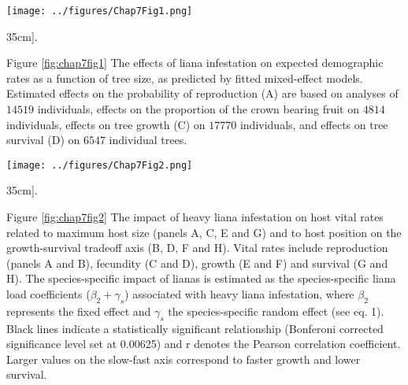 \documentclass[b5paper,justified]{tufte-book} %
\begin{document}
\begin{fullwidth}
\begin{figure*}
\hspace*{.5cm}\texttt{[image: ../figures/Chap7Fig1.png]}
\caption[The effects of liana infestation on expected demographic rates as a function of tree size][35cm]{.}
\label{fig:chap7fig1}
\hspace*{0.7cm} \begin{minipage}{12cm}
\footnotesize Figure \ref{fig:chap7fig1} 
The effects of liana infestation on expected demographic rates as a function of tree size, as predicted by fitted mixed-effect models.  Estimated effects on the probability of reproduction (A) are based on analyses of $14519$ individuals, effects on the proportion of the crown bearing fruit on $4814$  individuals, effects on tree growth (C) on $17770$  individuals, and effects on tree survival (D) on $6547$ individual trees.
\end{minipage}
\end{figure*}

\begin{figure*}
\hspace*{.25cm}\texttt{[image: ../figures/Chap7Fig2.png]}
\caption[The effects of liana infestation on expected demographic rates as a function of tree size][35cm]{.}
\label{fig:chap7fig2}
\hspace*{0.7cm} \begin{minipage}{12cm}
\footnotesize Figure \ref{fig:chap7fig2} 
The impact of heavy liana infestation on host vital rates related to maximum host size (panels A, C, E and G) and to host position on the growth-survival tradeoff axis (B, D, F and H). Vital rates include reproduction (panels A and B), fecundity (C and D), growth (E and F) and survival (G and H). The species-specific impact of lianas is estimated as the species-specific liana load coefficients ($\beta_2 + \gamma_{s}$) associated with heavy liana infestation, where $\beta_2$ represents the fixed effect and $\gamma_{s}$ the species-specific random effect (see eq. 1). Black lines indicate a statistically significant relationship (Bonferoni corrected significance level set at 0.00625) and r denotes the Pearson correlation coefficient. Larger values on the slow-fast axis correspond to faster growth and lower survival.
\end{minipage}
\end{figure*}



\end{fullwidth}
\end{document}

